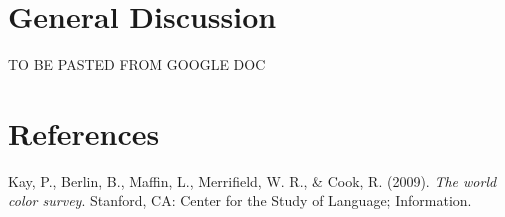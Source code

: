 \documentclass[,man,floatsintext]{apa6}
\theoremstyle{definition}
\theoremstyle{definition}
\theoremstyle{definition}
\theoremstyle{remark}
\begin{document}
\section{General Discussion}\label{general-discussion}

TO BE PASTED FROM GOOGLE DOC

\newpage

\section{References}\label{references}

\begingroup
\setlength{\parindent}{-0.5in} \setlength{\leftskip}{0.5in}

\hypertarget{refs}{}
\hypertarget{ref-berlin2009}{}
Kay, P., Berlin, B., Maffin, L., Merrifield, W. R., \& Cook, R. (2009).
\emph{The world color survey}. Stanford, CA: Center for the Study of
Language; Information.

\endgroup
\end{document}
